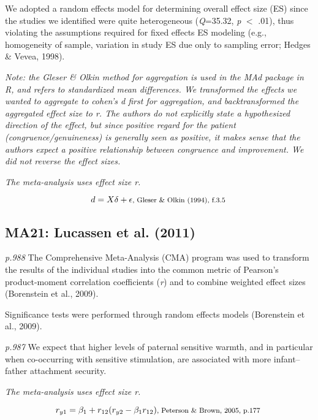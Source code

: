 \documentclass{article}
\begin{document}
We adopted a random effects model for determining overall effect size (ES) since the studies we identified were quite heterogeneous (\textit{Q}=35.32, \textit{p} $<$ .01), thus violating the assumptions required for fixed effects ES modeling (e.g., homogeneity of sample, variation in study ES due only to sampling error; Hedges \& Vevea, 1998).

\vspace{3 mm}
\textit{Note: the Gleser \& Olkin method for aggregation is used in the MAd package in R, and refers to standardized mean differences. We transformed the effects we wanted to aggregate to cohen's d first for aggregation, and backtransformed the aggregated effect size to r. The authors do not explicitly state a hypothesized direction of the effect, but since positive regard for the patient (congruence/genuineness) is generally seen as positive, it makes sense that the authors expect a positive relationship between congruence and improvement. We did not reverse the effect sizes. }

\vspace{3mm}
\textit{The meta-analysis uses effect size r.}

\begin{equation*}
{d= X\delta + \epsilon } \mbox{\footnotesize, Gleser \& Olkin (1994), f.3.5 }
\end{equation*}

\subsection*{MA21: Lucassen et al. (2011)}

\textit{p.988} The Comprehensive Meta-Analysis (CMA) program was used to transform the results of the individual studies into the common metric of Pearson’s product-moment correlation coefficients (\textit{r}) and to combine weighted effect sizes (Borenstein et al., 2009).

Significance tests were performed through random effects models (Borenstein et al., 2009).

\textit{p.987} We expect that higher levels of paternal sensitive warmth, and in particular when co-occurring with sensitive stimulation, are associated with more infant–father attachment security.

\vspace{3mm}
\textit{The meta-analysis uses effect size r.}

\begin{equation*}
r_{y1} = \beta_{1} + r_{12}(r_{y2}-\beta_{1}r_{12}) \mbox{\footnotesize, Peterson \& Brown, 2005, p.177 } 
\end{equation*}
\end{document}
